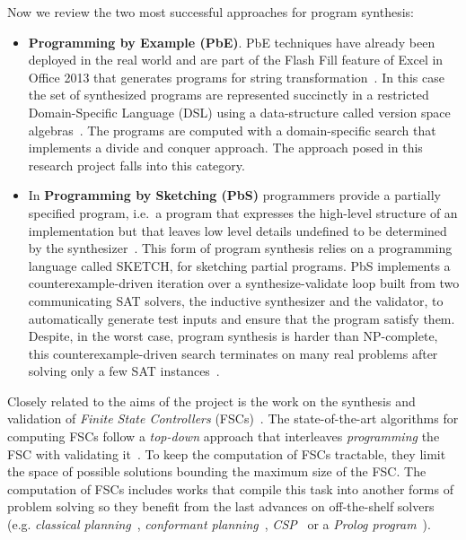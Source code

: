 \documentclass[10pt,a4paper]{paper}
\begin{document}
Now we review the two most successful approaches for program synthesis:
\begin{itemize}
\item{\bf Programming by Example (PbE)}. PbE techniques have already been deployed in the real world and are part of the {\sc Flash Fill} feature of Excel in Office 2013 that generates programs for string transformation~\cite{gulwani2011automating}. In this case the set of synthesized programs are represented succinctly in a restricted Domain-Specific Language (DSL) using a data-structure called version space algebras~\cite{mitchell1982generalization}. The programs are computed with a domain-specific search that implements a divide and conquer approach. The approach posed in this research project falls into this category.

\item In {\bf Programming by Sketching (PbS)} programmers provide a partially specified program, i.e.~a program that expresses the high-level structure of an implementation but that leaves low level details undefined to be determined by the synthesizer~\cite{solar2006combinatorial}. This form of program synthesis relies on a programming language called {\sc SKETCH}, for sketching partial programs. PbS implements a counterexample-driven iteration over a synthesize-validate loop built from two communicating SAT solvers, the inductive synthesizer and the validator, to automatically generate test inputs and ensure that the program satisfy them. Despite, in the worst case, program synthesis is harder than NP-complete, this counterexample-driven search terminates on many real problems after solving only a few SAT instances~\cite{lake2015human}.
\end{itemize}

Closely related to the aims of the project is the work on the synthesis and validation of {\it Finite State Controllers} (FSCs)~\cite{geffner:policies:IJCAI15}. The state-of-the-art algorithms for computing FSCs follow a {\it top-down} approach that interleaves {\it programming} the FSC with validating it~\cite{sergio:aprograming:ijcai16}. To keep the computation of FSCs tractable, they limit the space of possible solutions bounding the maximum size of the FSC. The computation of FSCs includes works that compile this task into another forms of problem solving so they benefit from the last advances on off-the-shelf solvers (e.g. {\em classical planning}~\cite{sergio:aprograming:icaps16}, {\em conformant planning}~\cite{Geffner:FSM:AAAI10}, {\em CSP}~\cite{Infantes:FSC:ECAI2010} or a {\em Prolog program}~\cite{Giacomo:FSM:ICAPS13}). 
\end{document}
